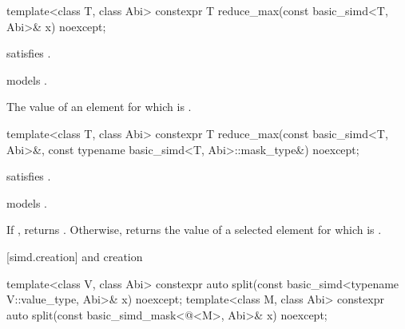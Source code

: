 \begin{itemdecl}
template<class T, class Abi> constexpr T reduce_max(const basic_simd<T, Abi>& x) noexcept;
\end{itemdecl}

\begin{itemdescr}
  \pnum\constraints
   satisfies .

  \pnum\expects
   models .

  \pnum\returns
  The value of an element  for which  is  \foralli.
\end{itemdescr}

\begin{itemdecl}
template<class T, class Abi>
  constexpr T reduce_max(const basic_simd<T, Abi>&, const typename basic_simd<T, Abi>::mask_type&) noexcept;
\end{itemdecl}

\begin{itemdescr}
  \pnum\constraints
   satisfies .

  \pnum\expects
   models .

  \pnum\returns
  If , returns .
  Otherwise, returns the value of a selected element  for which  is  \forallmaskedi.
\end{itemdescr}

[simd.creation]{ and  creation}

\begin{itemdecl}
  template<class V, class Abi>
    constexpr auto split(const basic_simd<typename V::value_type, Abi>& x) noexcept;
  template<class M, class Abi>
    constexpr auto split(const basic_simd_mask<@\maskelementsize@<M>, Abi>& x) noexcept;
  \end{itemdecl}

